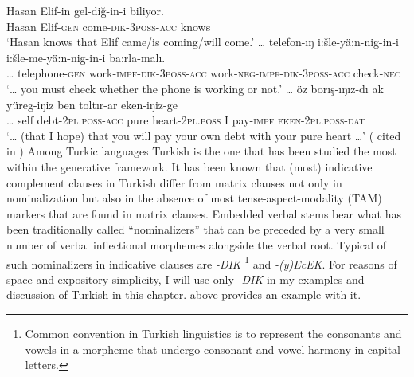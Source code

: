 \documentclass[output=paper]{langsci/langscibook}
\begin{document}
\ea%
\settowidth{}
    \label{kelepirex:key:1}
    \gll Hasan Elif-in gel-diğ-in-i biliyor.\\
    Hasan Elif-\textsc{gen} come-\textsc{dik}{}-\textsc{3poss}{}-\textsc{acc} knows\\
    \glt `Hasan knows that Elif came/is coming/will come.'
\ex%
    \label{kelepirex:key:2}
    \gll \ldots{} telefon-ıŋ i:šle-yä:n-nig-in-i i:šle-me-yä:n-nig-in-i ba:rla-malı.\\
    \ldots{} telephone-\textsc{gen}  work-\textsc{impf}{}-\textsc{dik}{}-\textsc{3poss}{}-\textsc{acc} work-\textsc{neg}{}-\textsc{impf}{}-\textsc{dik}{}-\textsc{3poss}{}-\textsc{acc} check-\textsc{nec} \\
    \glt `\ldots{} you must check whether the phone is working or not.'
\ex%
    \label{kelepirex:key:3}
    \gll \ldots{} öz borış-ıŋız-dı ak yüreg-iŋiz ben toltır-ar eken-iŋiz-ge \\
    \ldots{} self debt-\textsc{2pl.poss}{}-\textsc{acc} pure heart-\textsc{2pl.poss} I pay-\textsc{impf} \textsc{eken}{}-\textsc{2pl.poss}{}-\textsc{dat} \\
    \glt `\ldots{} (that I hope) that you will pay your own debt with your pure heart \ldots{}'
            (\citealp[125]{DjanbidaevaOgurlieva1995} cited in \citealp[354]{Karakoc2007})
\z 
Among Turkic languages Turkish is the one that has been studied the most within the generative framework. 
It has been known that (most) indicative complement clauses in Turkish differ from matrix clauses not only in nominalization 
but also in the absence of most tense-aspect-modality (TAM) markers that are found in matrix clauses.  
Embedded verbal stems bear what has been traditionally called ``nominalizers'' that can be preceded by a very small number 
of verbal inflectional morphemes alongside the verbal root. 
Typical of such nominalizers in indicative clauses are \textit{-DIK}%
\footnote{%
    Common convention in Turkish linguistics is to represent the consonants and vowels in a morpheme 
    that undergo consonant and vowel harmony in capital letters.
}
and \textit{-(y)EcEK}. 
For reasons of space and expository simplicity, I will use only \textit{-DIK} in my examples and discussion of Turkish in this chapter. 
 above provides an example with it. 
\end{document}

